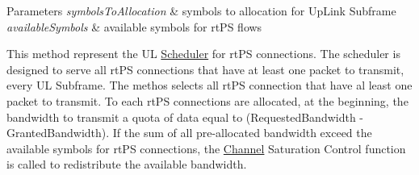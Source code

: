 \begin{DoxyParams}{Parameters}
{\em symbols\+To\+Allocation} & symbols to allocation for Up\+Link Subframe \\
\hline
{\em available\+Symbols} & available symbols for rt\+PS flows\\
\hline
\end{DoxyParams}
This method represent the UL \hyperlink{classns3_1_1Scheduler}{Scheduler} for rt\+PS connections. The scheduler is designed to serve all rt\+PS connections that have at least one packet to transmit, every UL Subframe. The methos selects all rt\+PS connection that have al least one packet to transmit. To each rt\+PS connections are allocated, at the beginning, the bandwidth to transmit a quota of data equal to (Requested\+Bandwidth -\/ Granted\+Bandwidth). If the sum of all pre-\/allocated bandwidth exceed the available symbols for rt\+PS connections, the \hyperlink{classns3_1_1Channel}{Channel} Saturation Control function is called to redistribute the available bandwidth. 
